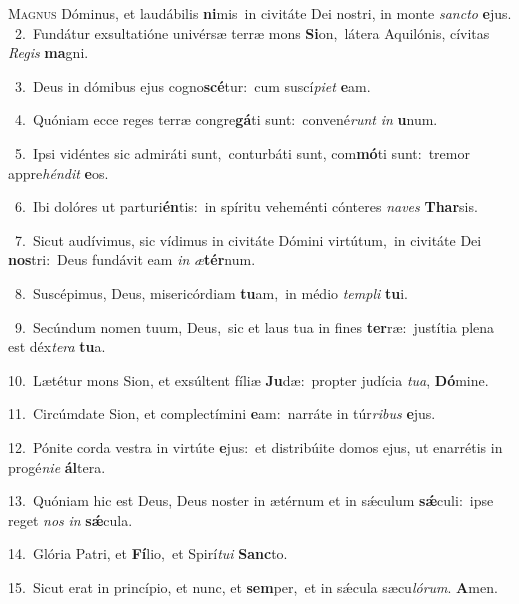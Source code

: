 \lettrine{\initial\textcolor{\initialcolor}{M}}{agnus} Dóminus, et laudábilis \textbf{ni}\-mis~\star in civitáte Dei nostri, in monte \textit{sanc}\-\textit{to} \textbf{e}\-jus.\\
{\numbfont\textcolor{\numbcolor}{~2.}}~Fundátur exsultatióne univérsæ terræ mons \textbf{Si}\-on,~\star látera Aquilónis, cívitas \textit{Re}\-\textit{gis} \textbf{ma}\-gni.\par
{\numbfont\textcolor{\numbcolor}{~3.}}~Deus in dómibus ejus cogno\-\textbf{scé}\-tur:~\star cum suscí\-\textit{pi}\-\textit{et} \textbf{e}\-am.\par
{\numbfont\textcolor{\numbcolor}{~4.}}~Quóniam ecce reges terræ congre\-\textbf{gá}\-ti sunt:~\star convené\textit{runt} \textit{in} \textbf{u}\-num.\par
{\numbfont\textcolor{\numbcolor}{~5.}}~Ipsi vidéntes sic admiráti sunt,~\dagger conturbáti sunt, com\-\textbf{mó}\-ti sunt:~\star tremor appre\-\textit{hén}\-\textit{dit} \textbf{e}\-os.\par
{\numbfont\textcolor{\numbcolor}{~6.}}~Ibi dolóres ut parturi\-\textbf{én}\-tis:~\star in spíritu veheménti cónteres \textit{na}\-\textit{ves} \textbf{Thar}\-sis.\par
{\numbfont\textcolor{\numbcolor}{~7.}}~Sicut audívimus, sic vídimus in civitáte Dómini virtútum,~\dagger in civitáte Dei \textbf{nos}\-tri:~\star Deus fundávit eam \textit{in} \textit{æ}\-\textbf{tér}num.\par
{\numbfont\textcolor{\numbcolor}{~8.}}~Suscépimus, Deus, misericórdiam \textbf{tu}\-am,~\star in médio \textit{tem}\-\textit{pli} \textbf{tu}\-i.\par
{\numbfont\textcolor{\numbcolor}{~9.}}~Secúndum nomen tuum, Deus,~\dagger sic et laus tua in fines \textbf{ter}\-ræ:~\star justítia plena est déx\-\textit{te}\-\textit{ra} \textbf{tu}\-a.\par
{\numbfont\textcolor{\numbcolor}{10.}}~Lætétur mons Sion, et exsúltent fíliæ \textbf{Ju}\-dæ:~\star propter judícia \textit{tu}\-\textit{a}, \textbf{Dó}\-mine.\par
{\numbfont\textcolor{\numbcolor}{11.}}~Circúmdate Sion, et complectímini \textbf{e}\-am:~\star narráte in túr\-\textit{ri}\-\textit{bus} \textbf{e}\-jus.\par
{\numbfont\textcolor{\numbcolor}{12.}}~Pónite corda vestra in virtúte \textbf{e}\-jus:~\star et distribúite domos ejus, ut enarrétis in progé\-\textit{ni}\-\textit{e} \textbf{ál}\-tera.\par
{\numbfont\textcolor{\numbcolor}{13.}}~Quóniam hic est Deus, Deus noster in ætérnum et in sǽculum \textbf{sǽ}\-culi:~\star ipse reget \textit{nos} \textit{in} \textbf{sǽ}\-cula.\par
{\numbfont\textcolor{\numbcolor}{14.}}~Glória Patri, et \textbf{Fí}\-lio,~\star et Spirí\-\textit{tu}\-\textit{i} \textbf{Sanc}\-to.\par
{\numbfont\textcolor{\numbcolor}{15.}}~Sicut erat in princípio, et nunc, et \textbf{sem}\-per,~\star et in sǽcula sæcu\-\textit{ló}\-\textit{rum}. \textbf{A}\-men.\par
